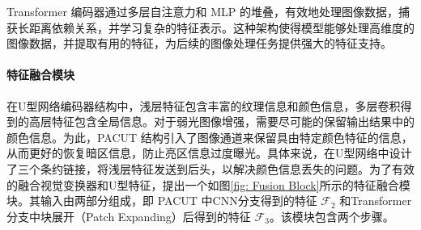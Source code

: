 \documentclass[a4paper]{ctexart}
\begin{document}
	Transformer 编码器通过多层自注意力和 MLP 的堆叠，有效地处理图像数据，捕获长距离依赖关系，并学习复杂的特征表示。这种架构使得模型能够处理高维度的图像数据，并提取有用的特征，为后续的图像处理任务提供强大的特征支持。
	
%	
%	
%	
%	
%	
	
	\paragraph{特征融合模块}
	
	在U型网络编码器结构中，浅层特征包含丰富的纹理信息和颜色信息，多层卷积得到的高层特征包含全局信息。对于弱光图像增强，需要尽可能的保留输出结果中的颜色信息。为此，PACUT 结构引入了图像通道来保留具由特定颜色特征的信息，从而更好的恢复暗区信息，防止亮区信息过度曝光。具体来说，在U型网络中设计了三个条约链接，将浅层特征发送到后头，以解决颜色信息丢失的问题。为了有效的融合视觉变换器和U型特征，提出一个如图\ref{fig: Fusion Block}所示的特征融合模块。其输入由两部分组成，即 PACUT 中CNN分支得到的特征 $\mathcal{F}_2$ 和Transformer分支中块展开（Patch Expanding）后得到的特征 $\mathcal{F}_3$。该模块包含两个步骤。
	
\end{document}
